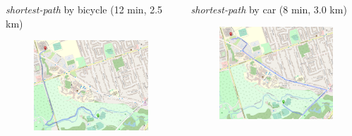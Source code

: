 \documentclass[aspectratio=169]{beamer}
\begin{document}
\begin{frame}
	
	\begin{columns}
		\begin{column}{0.5\textwidth}
			\small \textit{shortest-path} by bicycle (12 min, 2.5 km)
			\begin{figure}
				\centering
				\includegraphics[width=1\linewidth]{images/route_utsc_bike}
			\end{figure}
		\end{column}
		\begin{column}{0.5\textwidth}
			
			\small \textit{shortest-path} by car (8 min, 3.0 km)
			\begin{figure}
				\centering
				\includegraphics[width=1\linewidth]{images/route_utsc_car}
			\end{figure}
		\end{column}
	\end{columns}


\end{frame}
\end{document}
